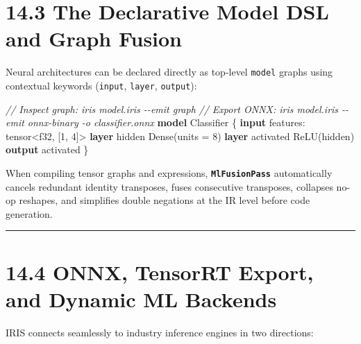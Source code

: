 \documentclass[
  english,
  oneside]{book}
\newenvironment{Shaded}{\begin{snugshade}}{\end{snugshade}}
\newcommand{\CommentTok}[1]{\textcolor[rgb]{0.42,0.60,0.33}{\textit{#1}}}
\newcommand{\DataTypeTok}[1]{\textcolor[rgb]{0.31,0.79,0.69}{#1}}
\newcommand{\DecValTok}[1]{\textcolor[rgb]{0.71,0.81,0.66}{#1}}
\newcommand{\KeywordTok}[1]{\textcolor[rgb]{0.34,0.61,0.84}{\textbf{#1}}}
\newcommand{\NormalTok}[1]{\textcolor[rgb]{0.83,0.83,0.83}{#1}}
\newcommand{\OperatorTok}[1]{\textcolor[rgb]{0.83,0.83,0.83}{#1}}
\begin{document}
\section{14.3 The Declarative Model DSL and Graph
Fusion}\label{the-declarative-model-dsl-and-graph-fusion}

Neural architectures can be declared directly as top-level
\texttt{model} graphs using contextual keywords (\texttt{input},
\texttt{layer}, \texttt{output}):

\begin{Shaded}
\begin{Highlighting}[]
\CommentTok{// Inspect graph: iris model.iris {-}{-}emit graph}
\CommentTok{// Export ONNX:   iris model.iris {-}{-}emit onnx{-}binary {-}o classifier.onnx}
\KeywordTok{model}\NormalTok{ Classifier \{}
    \KeywordTok{input}\NormalTok{ features: }\DataTypeTok{tensor}\OperatorTok{\textless{}}\DataTypeTok{f32}\NormalTok{, [}\DecValTok{1}\NormalTok{, }\DecValTok{4}\NormalTok{]}\OperatorTok{\textgreater{}}
    \KeywordTok{layer}\NormalTok{ hidden Dense(units }\OperatorTok{=} \DecValTok{8}\NormalTok{)}
    \KeywordTok{layer}\NormalTok{ activated ReLU(hidden)}
    \KeywordTok{output}\NormalTok{ activated}
\NormalTok{\}}
\end{Highlighting}
\end{Shaded}

When compiling tensor graphs and expressions,
\textbf{\texttt{MlFusionPass}} automatically cancels redundant identity
transposes, fuses consecutive transposes, collapses no-op reshapes, and
simplifies double negations at the IR level before code generation.

\begin{center}\rule{0.5\linewidth}{0.5pt}\end{center}

\section{14.4 ONNX, TensorRT Export, and Dynamic ML
Backends}\label{onnx-tensorrt-export-and-dynamic-ml-backends}

IRIS connects seamlessly to industry inference engines in two
directions:
\end{document}
